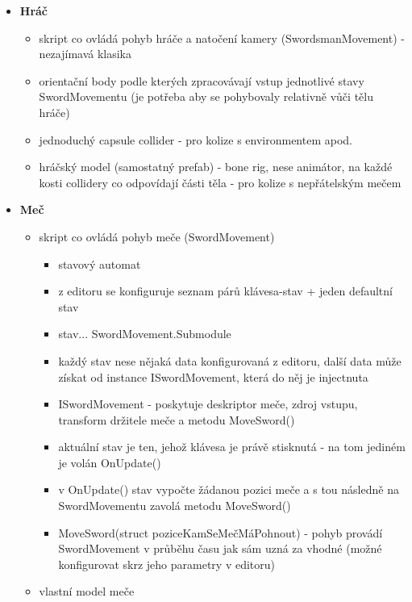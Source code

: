 \begin{itemize}
    \item \textbf{Hráč}
        \begin{itemize}
            \item skript co ovládá pohyb hráče a natočení kamery (SwordsmanMovement) - nezajímavá klasika
            \item orientační body podle kterých zpracovávají vstup jednotlivé stavy SwordMovementu (je potřeba aby se pohybovaly relativně vůči tělu hráče)
            \item jednoduchý capsule collider - pro kolize s environmentem apod.
            \item hráčský model (samostatný prefab) - bone rig, nese animátor, na každé kosti collidery co odpovídají části těla - pro kolize s nepřátelským mečem 
        \end{itemize} 
    \item \textbf{Meč} 
        \begin{itemize}
            \item skript co ovládá pohyb meče (SwordMovement)
                \begin{itemize}
                    \item stavový automat
                    \item z editoru se konfiguruje seznam párů klávesa-stav + jeden defaultní stav
                    \item stav... SwordMovement.Submodule
                    \item každý stav nese nějaká data konfigurovaná z editoru, další data může získat od instance ISwordMovement, která do něj je injectnuta
                    \item ISwordMovement - poskytuje deskriptor meče, zdroj vstupu, transform držitele meče a metodu MoveSword()
                    \item aktuální stav je ten, jehož klávesa je právě stisknutá - na tom jediném je volán OnUpdate()
                    \item v OnUpdate() stav vypočte žádanou pozici meče a s tou následně na SwordMovementu zavolá metodu MoveSword()
                    \item MoveSword(struct poziceKamSeMečMáPohnout) - pohyb provádí SwordMovement v průběhu času jak sám uzná za vhodné (možné konfigurovat skrz jeho parametry v editoru)
                \end{itemize}
            \item vlastní model meče

\end{itemize}
\end{itemize}
